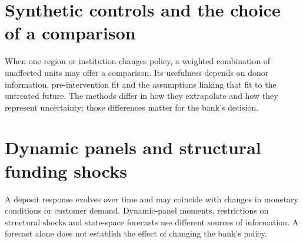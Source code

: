 \documentclass[11pt,a4paper,openany]{book}
\begin{document}


\chapter{Synthetic controls and the choice of a comparison}
When one region or institution changes policy, a weighted combination
of unaffected units may offer a comparison. Its usefulness depends on donor
information, pre-intervention fit and the assumptions linking that fit to the
untreated future. The methods differ in how they extrapolate and how they
represent uncertainty; those differences matter for the bank's decision.












\chapter{Dynamic panels and structural funding shocks}
A deposit response evolves over time and may coincide with changes in
monetary conditions or customer demand. Dynamic-panel moments, restrictions
on structural shocks and state-space forecasts use different sources of
information. A forecast alone does not establish the effect of changing the
bank's policy.
\end{document}
